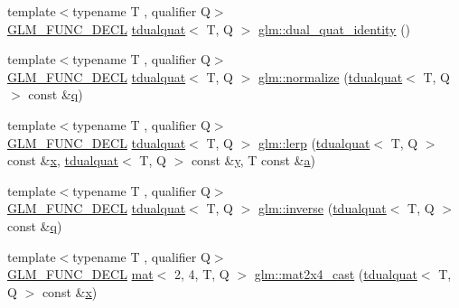 \begin{DoxyCompactItemize}
\item 
{\footnotesize template$<$typename T , qualifier Q$>$ }\\\hyperlink{setup_8hpp_ab2d052de21a70539923e9bcbf6e83a51}{G\+L\+M\+\_\+\+F\+U\+N\+C\+\_\+\+D\+E\+CL} \hyperlink{structglm_1_1tdualquat}{tdualquat}$<$ T, Q $>$ \hyperlink{group__gtx__dual__quaternion_ga0b35c0e30df8a875dbaa751e0bd800e0}{glm\+::dual\+\_\+quat\+\_\+identity} ()
\item 
{\footnotesize template$<$typename T , qualifier Q$>$ }\\\hyperlink{setup_8hpp_ab2d052de21a70539923e9bcbf6e83a51}{G\+L\+M\+\_\+\+F\+U\+N\+C\+\_\+\+D\+E\+CL} \hyperlink{structglm_1_1tdualquat}{tdualquat}$<$ T, Q $>$ \hyperlink{group__gtx__dual__quaternion_ga299b8641509606b1958ffa104a162cfe}{glm\+::normalize} (\hyperlink{structglm_1_1tdualquat}{tdualquat}$<$ T, Q $>$ const \&\hyperlink{_s_d_l__opengl_8h_a8fc1e7b9baaae687804c7eed46ca09c6}{q})
\item 
{\footnotesize template$<$typename T , qualifier Q$>$ }\\\hyperlink{setup_8hpp_ab2d052de21a70539923e9bcbf6e83a51}{G\+L\+M\+\_\+\+F\+U\+N\+C\+\_\+\+D\+E\+CL} \hyperlink{structglm_1_1tdualquat}{tdualquat}$<$ T, Q $>$ \hyperlink{group__gtx__dual__quaternion_gace8380112d16d33f520839cb35a4d173}{glm\+::lerp} (\hyperlink{structglm_1_1tdualquat}{tdualquat}$<$ T, Q $>$ const \&\hyperlink{_s_d_l__opengl_8h_ad0e63d0edcdbd3d79554076bf309fd47}{x}, \hyperlink{structglm_1_1tdualquat}{tdualquat}$<$ T, Q $>$ const \&\hyperlink{_s_d_l__opengl_8h_a1675d9d7bb68e1657ff028643b4037e3}{y}, T const \&\hyperlink{_s_d_l__opengl__glext_8h_a3309789fc188587d666cda5ece79cf82}{a})
\item 
{\footnotesize template$<$typename T , qualifier Q$>$ }\\\hyperlink{setup_8hpp_ab2d052de21a70539923e9bcbf6e83a51}{G\+L\+M\+\_\+\+F\+U\+N\+C\+\_\+\+D\+E\+CL} \hyperlink{structglm_1_1tdualquat}{tdualquat}$<$ T, Q $>$ \hyperlink{group__gtx__dual__quaternion_ga070f521a953f6461af4ab4cf8ccbf27e}{glm\+::inverse} (\hyperlink{structglm_1_1tdualquat}{tdualquat}$<$ T, Q $>$ const \&\hyperlink{_s_d_l__opengl_8h_a8fc1e7b9baaae687804c7eed46ca09c6}{q})
\item 
{\footnotesize template$<$typename T , qualifier Q$>$ }\\\hyperlink{setup_8hpp_ab2d052de21a70539923e9bcbf6e83a51}{G\+L\+M\+\_\+\+F\+U\+N\+C\+\_\+\+D\+E\+CL} \hyperlink{structglm_1_1mat}{mat}$<$ 2, 4, T, Q $>$ \hyperlink{group__gtx__dual__quaternion_gae99d143b37f9cad4cd9285571aab685a}{glm\+::mat2x4\+\_\+cast} (\hyperlink{structglm_1_1tdualquat}{tdualquat}$<$ T, Q $>$ const \&\hyperlink{_s_d_l__opengl_8h_ad0e63d0edcdbd3d79554076bf309fd47}{x})

\end{DoxyCompactItemize}
